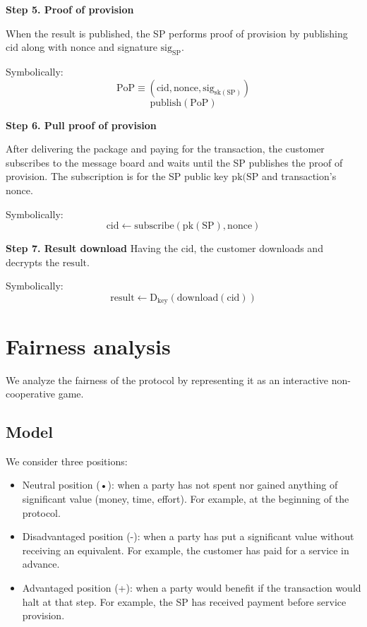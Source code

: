 \documentclass{ieeeaccess}
\begin{document}
\noindent \textbf
{Step 5. Proof of provision}\label{step-5-proof-of-provision-publication}

When the result is published, the SP performs proof of provision by publishing $\mathrm{cid}$ along with $\mathrm{nonce}$ and signature $\mathrm{sig}_\mathrm{SP}$.

Symbolically: 
\[
\mathrm{PoP} \equiv (\mathrm{cid}, \mathrm{nonce}, \mathrm{sig}_{\mathrm{sk}(\mathrm{SP})})
\]
\[
\mathrm{publish}(\mathrm{PoP})
\]

\noindent \textbf
{Step 6. Pull proof of provision}\label{step-6-proof-of-provision-notification}

After delivering the package and paying for the transaction, the customer subscribes to the message board and waits until the SP publishes the proof of provision. The subscription is for the SP public key $\mathrm{pk}(\mathrm{SP}$ and transaction's $\mathrm{nonce}$.

Symbolically: 
\[
\mathrm{cid} \gets \mathrm{subscribe}(\mathrm{pk}(\mathrm{SP}), \mathrm{nonce})
\]

\noindent \textbf
{Step 7. Result download}\label{step-7-results-download} 
Having the $\mathrm{cid}$, the customer downloads and decrypts the $\mathrm{result}$.

Symbolically: 
\[
\mathrm{result} \gets \mathrm{D}_{\mathrm{key}}(\mathrm{download}(\mathrm{cid}))
\]


\section{Fairness analysis}\label{sec:fairness-analysis}

We analyze the fairness of the protocol by representing it as an interactive non-cooperative game.

\subsection{Model}\label{model}
We consider three positions:

\begin{itemize}
\item Neutral position (•): when a party has not spent nor gained anything of significant value (money, time, effort). For example, at the beginning of the protocol.
\item Disadvantaged position (-): when a party has put a significant value without receiving an equivalent. For example, the customer has paid for a service in advance.
\item Advantaged position (+): when a party would benefit if the transaction would halt at that step. For example, the SP has received payment before service provision.
\end{itemize}
\end{document}

